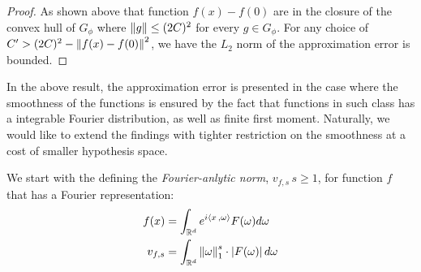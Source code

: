 \begin{proof}
    As shown above that function $f(x) - f(0)$ are in the closure of the convex
    hull of $G_{\phi}$ where $\left\| g \right\| \leq (2C)^2$ for every $g \in G_{\phi}$.
    For any choice of $C' > (2C)^2 - \left\| f(x) - f(0) \right\|^2$, we have the $L_2$
    norm of the approximation error is bounded.




\end{proof}



In the above result, the approximation error is presented in the case where the
smoothness of the functions is ensured by the fact that functions in such class
has a integrable Fourier distribution, as well as finite first moment.
Naturally, we would like to extend the findings with tighter restriction on the
smoothness at a cost of smaller hypothesis space.

We start with the defining the \textit{Fourier-anlytic norm}, $v_{f, s}\, s \geq
    1$, for function $f$ that has a Fourier representation:
\begin{align}
    f(x)     & = \int_{\mathbb{R}^d} e^{i\left\langle x\, , \omega \right\rangle} F(\omega) d\omega \label{eq:fourier_rep}           \\
    v_{f, s} & = \int_{\mathbb{R}^d} \left\| \omega \right\|_1^s \cdot \left| F(\omega) \right| d\omega \label{eq:fourier_norm}
\end{align}


